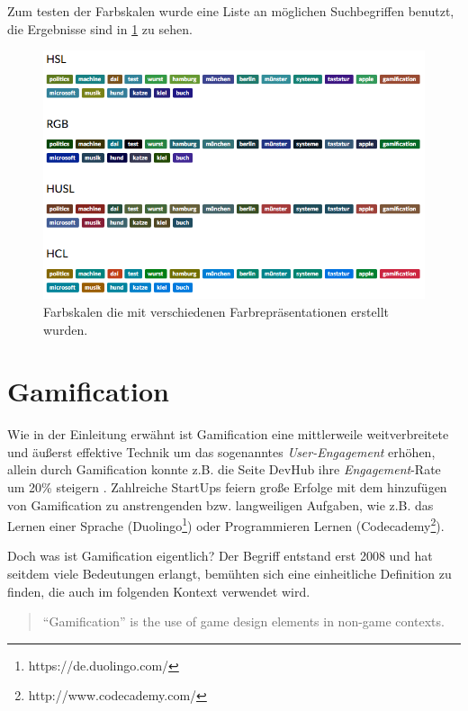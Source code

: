 \documentclass[12pt,twoside]{book}
\begin{document}
Zum testen der Farbskalen wurde eine Liste an möglichen Suchbegriffen benutzt, die Ergebnisse sind in \ref{fig:colors} zu sehen.

\begin{figure}[H]
    \centering
    \includegraphics[width=1.0\textwidth]{images/colors}
    \caption{Farbskalen die mit verschiedenen Farbrepräsentationen erstellt wurden.}
    \label{fig:colors}
\end{figure}

\section{Gamification}

Wie in der Einleitung erwähnt ist Gamification eine mittlerweile weitverbreitete und äußerst effektive Technik um das sogenanntes \textit{User-Engagement} erhöhen, allein durch Gamification konnte z.B. die Seite DevHub ihre \textit{Engagement}-Rate um 20\% steigern \citep{zichermann2011gamification, 17}. Zahlreiche StartUps feiern große Erfolge mit dem hinzufügen von Gamification zu anstrengenden bzw. langweiligen Aufgaben, wie z.B. das Lernen einer Sprache (Duolingo\footnote{https://de.duolingo.com/}) oder Programmieren Lernen (Codecademy\footnote{http://www.codecademy.com/}).

Doch was ist Gamification eigentlich? Der Begriff entstand erst 2008 und hat seitdem viele Bedeutungen erlangt, \citep{deterding2011game} bemühten sich eine einheitliche Definition zu finden, die auch im folgenden Kontext verwendet wird.

\begin{quote}
	``Gamification'' is the use of game design elements in non-game contexts.
\end{quote}
\end{document}
